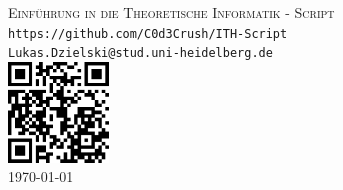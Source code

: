 \documentclass{article}
\begin{document}
\begin{titlepage}
    \centering
    \vspace*{2cm}
  
    \vspace{1cm}
  
    \textsc{\Large Einführung in die Theoretische Informatik - Script}\\[1.5cm]
    
    \texttt{\large https://github.com/C0d3Crush/ITH-Script}\\
    \texttt{\large Lukas.Dzielski@stud.uni-heidelberg.de}\\[2cm]

    \includegraphics[width=0.2\textwidth]{qrcode.png}\\[10cm]

  
    {\large \today}\\[2cm]
  
    \vfill
  
  \end{titlepage}
\newpage
\tableofcontents
\newpage





\end{document}
